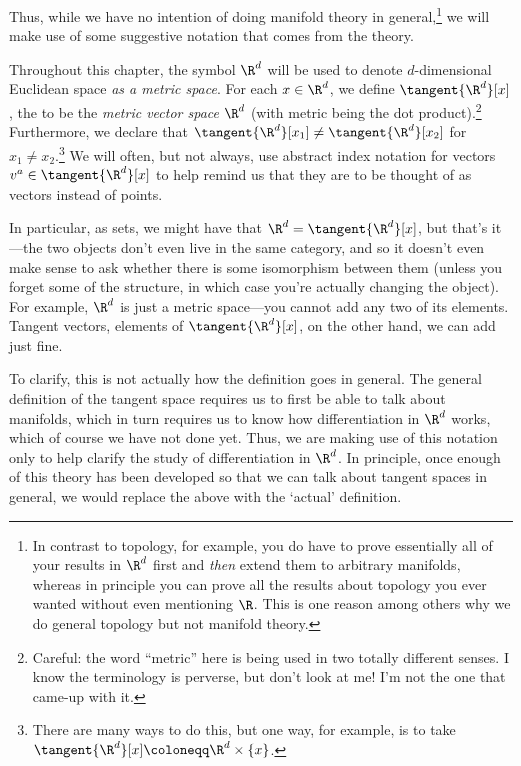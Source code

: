 Thus, while we have no intention of doing manifold theory in general,\footnote{In contrast to topology, for example, you do have to prove essentially all of your results in $\R ^d$ first and \emph{then} extend them to arbitrary manifolds, whereas in principle you can prove all the results about topology you ever wanted without even mentioning $\R$.  This is one reason among others why we do general topology but not manifold theory.} we will make use of some suggestive notation that comes from the theory.
\begin{important}
Throughout this chapter, the symbol $\R ^d$ will be used to denote $d$-dimensional Euclidean space \emph{as a metric space}.  For each $x\in \R ^d$, we define $\tangent{\R ^d}[x]$, the  to be the \emph{metric vector space} $\R ^d$ (with metric being the dot product).\footnote{Careful:  the word ``metric'' here is being used in two totally different senses.  I know the terminology is perverse, but don't look at me!  I'm not the one that came-up with it.}  Furthermore, we declare that $\tangent{\R ^d}[x_1]\neq \tangent{\R ^d}[x_2]$ for $x_1\neq x_2$.\footnote{There are many ways to do this, but one way, for example, is to take $\tangent{\R ^d}[x]\coloneqq \R ^d\times \{ x\}$.}  We will often, but not always, use abstract index notation for vectors $v^a\in \tangent{\R ^d}[x]$ to help remind us that they are to be thought of as vectors instead of points.
\end{important}
In particular, as sets, we might have that $\R ^d=\tangent{\R ^d}[x]$, but that's it---the two objects don't even live in the same category, and so it doesn't even make sense to ask whether there is some isomorphism between them (unless you forget some of the structure, in which case you're actually changing the object).  For example, $\R ^d$ is just a metric space---you cannot add any two of its elements.  Tangent vectors, elements of $\tangent{\R ^d}[x]$, on the other hand, we can add just fine.

To clarify, this is not actually how the definition goes in general.  The general definition of the tangent space requires us to first be able to talk about manifolds, which in turn requires us to know how differentiation in $\R ^d$ works, which of course we have not done yet.  Thus, we are making use of this notation only to help clarify the study of differentiation in $\R ^d$.  In principle, once enough of this theory has been developed so that we can talk about tangent spaces in general, we would replace the above with the `actual' definition.

